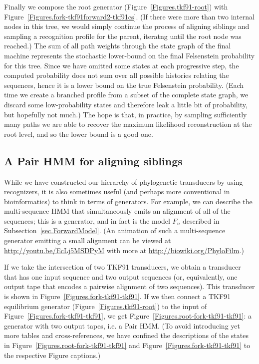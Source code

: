\documentclass{article}
\newcommand{\secref}[1]{Subsection~\ref{sec.#1}}
\newcommand{\figref}[1]{Figure~\ref{Figures.#1}}
\newcommand{\needfig}[1]{{\bf Need figure: } #1 }
\begin{document}

Finally we compose the root generator (\figref{tkf91-root})
with \figref{fork-tkf91forward2-tkf91cs}.
(If there were more than two internal nodes in this tree,
we would simply continue the process of aligning siblings and sampling a recognition profile for the parent,
iteratng until the root node was reached.)
The sum of all path weights through the state graph of the final machine
 represents the stochastic lower-bound
on the final Felsenstein probability for this tree.
Since we have omitted some states at each progressive step,
the computed probability does not sum over all possible histories
relating the sequences, hence it is a lower bound on the true Felsenstein probability.
(Each time we create a branched profile from a subset of the complete state graph,
we discard some low-probability states and therefore leak a little bit of probability, but hopefully not much.)
The hope is that, in practice, by sampling sufficiently many paths we are able to 
recover the maximum likelihood reconstruction at the root level, and so the
lower bound is a good one.


\subsection{A Pair HMM for aligning siblings}

While we have constructed our hierarchy of phylogenetic transducers by using recognizers,
it is also sometimes useful (and perhaps more conventional in bioinformatics) to think in terms of generators.
For example, we can describe the multi-sequence HMM that simultaneously emits an alignment of all of the sequences;
this is a generator, and in fact is the model $F_n$ described in \secref{ForwardModel}.
(An animation of such a multi-sequence generator emitting a small alignment can be viewed at
\url{http://youtu.be/EcLj5MSDPyM} with more at \url{http://biowiki.org/PhyloFilm}.)

If we take the intersection of two TKF91 transducers, we obtain a transducer that has one input sequence and two output sequences
(or, equivalently, one output tape that encodes a pairwise alignment of two sequences).
This transducer is shown in \figref{fork-tkf91-tkf91}.
If we then connect a TKF91 equilibrium generator (\figref{tkf91-root}) to the input of \figref{fork-tkf91-tkf91},
we get \figref{root-fork-tkf91-tkf91}: a generator with two output tapes, i.e. a Pair HMM.
(To avoid introducing yet more tables and cross-references, we have confined the descriptions
 of the states in \figref{root-fork-tkf91-tkf91} and \figref{fork-tkf91-tkf91}
 to the respective Figure captions.)
\end{document}
